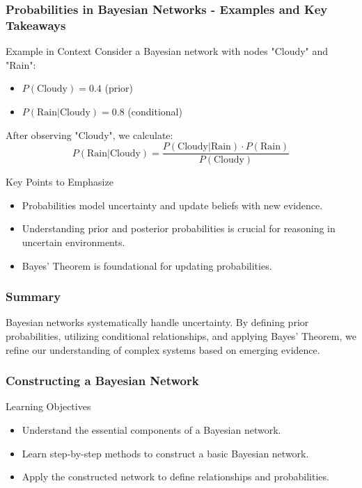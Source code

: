 \documentclass[aspectratio=169]{beamer}
\begin{document}
\begin{frame}[fragile]
    \frametitle{Probabilities in Bayesian Networks - Examples and Key Takeaways}
    
    \begin{block}{Example in Context}
        Consider a Bayesian network with nodes "Cloudy" and "Rain":
        \begin{itemize}
            \item \( P(\text{Cloudy}) = 0.4 \) (prior)
            \item \( P(\text{Rain} | \text{Cloudy}) = 0.8 \) (conditional)
        \end{itemize}
        
        After observing "Cloudy", we calculate:
        \begin{equation}
        P(\text{Rain} | \text{Cloudy}) = \frac{P(\text{Cloudy} | \text{Rain}) \cdot P(\text{Rain})}{P(\text{Cloudy})}
        \end{equation}
    \end{block}

    \begin{block}{Key Points to Emphasize}
        \begin{itemize}
            \item Probabilities model uncertainty and update beliefs with new evidence.
            \item Understanding prior and posterior probabilities is crucial for reasoning in uncertain environments.
            \item Bayes' Theorem is foundational for updating probabilities.
        \end{itemize}
    \end{block}
\end{frame}

\begin{frame}[fragile]
    \frametitle{Summary}
    Bayesian networks systematically handle uncertainty. By defining prior probabilities, utilizing conditional relationships, and applying Bayes' Theorem, we refine our understanding of complex systems based on emerging evidence.
\end{frame}

\begin{frame}[fragile]
    \frametitle{Constructing a Bayesian Network}
    \begin{block}{Learning Objectives}
        \begin{itemize}
            \item Understand the essential components of a Bayesian network.
            \item Learn step-by-step methods to construct a basic Bayesian network.
            \item Apply the constructed network to define relationships and probabilities.
        \end{itemize}
    \end{block}
\end{frame}
\end{document}
